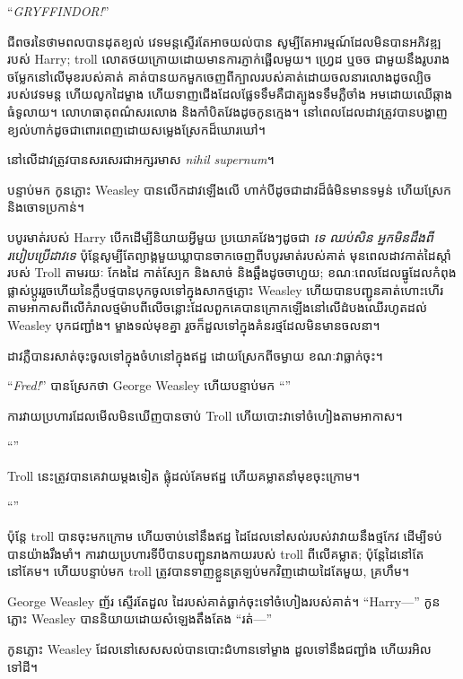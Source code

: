 “\emph{GRYFFINDOR!}”

ជីពចរនៃថាមពលបានដុតខ្យល់ វេទមន្តស្ទើរតែអាចយល់បាន សូម្បីតែអារម្មណ៍ដែលមិនបានអភិវឌ្ឍរបស់ Harry; troll លោត​ថយ​ក្រោយ​ដោយ​មាន​ការ​ភ្ញាក់ផ្អើល​មួយ​។ ហ្វ្រេដ ឬចច ជាមួយនឹងរូបរាងចម្លែកនៅលើមុខរបស់គាត់ គាត់បានយកមួកចេញពីក្បាលរបស់គាត់ដោយចលនារលោងដូចល្បិចរបស់វេទមន្ត ហើយលូកដៃម្ខាង ហើយទាញជើងដែលផ្លែទទឹមគឺជាត្បូងទទឹមភ្លឺចាំង អមដោយឈើឆ្កាងធំទូលាយ។ លោហធាតុពណ៌សរលោង និងកាំបិតវែងដូចកូនក្មេង។ នៅពេលដែលដាវត្រូវបានបង្ហាញ ខ្យល់ហាក់ដូចជាពោរពេញដោយសម្លេងស្រែកដ៏ឃោរឃៅ។

នៅលើដាវត្រូវបានសរសេរជាអក្សរមាស \emph{nihil supernum}។

បន្ទាប់មក កូនភ្លោះ Weasley បានលើកដាវឡើងលើ ហាក់បីដូចជាដាវដ៏ធំមិនមានទម្ងន់ ហើយស្រែក និងចោទប្រកាន់។

បបូរមាត់របស់ Harry បើកដើម្បីនិយាយអ្វីមួយ ប្រយោគវែងៗដូចជា \emph{ទេ ឈប់សិន អ្នកមិនដឹងពីរបៀបប្រើដាវទេ} ប៉ុន្តែសូម្បីតែព្យាង្គមួយឃ្លាបានចាកចេញពីបបូរមាត់របស់គាត់ មុនពេលដាវកាត់ដៃស្តាំរបស់ Troll តាមរយៈ កែងដៃ កាត់ស្បែក និងសាច់ និងឆ្អឹងដូចចាហួយ; ខណៈពេលដែលធ្នូដែលកំពុងផ្លាស់ប្តូររួចហើយនៃក្លឹបថ្មបានបុកចូលទៅក្នុងសាកថ្មភ្លោះ Weasley ហើយបានបញ្ជូនគាត់ហោះហើរតាមអាកាសពីលើកំរាលថ្មម៉ាបពីលើចន្លោះដែលពួកគេបានក្រោកឡើងនៅលើដំបងឈើរហូតដល់ Weasley បុកជញ្ជាំង។ ម្ខាង​ទល់​មុខ​គ្នា រួច​ក៏​ដួល​ទៅ​ក្នុង​គំនរ​ថ្ម​ដែល​មិន​មាន​ចលនា។

ដាវ​ភ្លឺ​បាន​រសាត់​ចុះ​ចូល​ទៅ​ក្នុង​ចំហ​នៅ​ក្នុង​ឥដ្ឋ ដោយ​ស្រែក​ពី​ចម្ងាយ ខណៈ​វា​ធ្លាក់​ចុះ។

“\emph{Fred!}” បានស្រែកថា George Weasley ហើយបន្ទាប់មក “”

ការ​វាយ​ប្រហារ​ដែល​មើល​មិន​ឃើញ​បាន​ចាប់​ Troll ហើយ​បោះ​វា​ទៅ​ចំហៀង​តាម​អាកាស។

“”

Troll នេះ​ត្រូវ​បាន​គេ​វាយ​ម្តង​ទៀត ផ្លុំ​ដល់​គែម​ឥដ្ឋ ហើយ​គម្លាត​នាំ​មុខ​ចុះ​ក្រោម។

“”

ប៉ុន្តែ troll បាន​ចុះ​មក​ក្រោម ហើយ​ចាប់​នៅ​នឹង​ឥដ្ឋ ដៃ​ដែល​នៅ​សល់​របស់​វា​វាយ​នឹង​ថ្មកែវ ដើម្បី​ទប់​បាន​យ៉ាង​រឹង​មាំ។ ការវាយប្រហារទីបីបានបញ្ជូនរាងកាយរបស់ troll ពីលើគម្លាត; ប៉ុន្តែដៃនៅតែនៅគែម។ ហើយបន្ទាប់មក troll ត្រូវបានទាញខ្លួនត្រឡប់មកវិញដោយដៃតែមួយ, គ្រហឹម។

George Weasley ញ័រ ស្ទើរតែដួល ដៃរបស់គាត់ធ្លាក់ចុះទៅចំហៀងរបស់គាត់។ “Harry—” កូនភ្លោះ Weasley បាននិយាយដោយសំឡេងតឹងតែង “រត់—”

កូនភ្លោះ Weasley ដែលនៅសេសសល់បានបោះជំហានទៅម្ខាង ដួលទៅនឹងជញ្ជាំង ហើយរអិលទៅដី។

